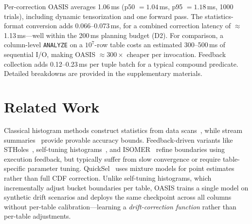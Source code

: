 \documentclass[runningheads]{llncs}
\begin{document}
Per-correction OASIS averages 1.06\,ms (p50 ${=}1.04$\,ms, p95 ${=}1.18$\,ms, 1000 trials), including dynamic tensorization and one forward pass. The statistics-format conversion adds 0.066--0.073\,ms, for a combined correction latency of $\approx$1.13\,ms---well within the 200\,ms planning budget (D2). For comparison, a column-level \texttt{ANALYZE} on a $10^7$-row table costs an estimated 300--500\,ms of sequential I/O, making OASIS ${\approx}300\times$ cheaper per invocation. Feedback collection adds 0.12--0.23\,ms per tuple batch for a typical compound predicate. Detailed breakdowns are provided in the supplementary materials.


\section{Related Work}
\label{sec:related}
Classical histogram methods construct statistics from data scans~\cite{ioannidis1993histogram,poosala1997selectivity}, while stream summaries~\cite{ivkin2019kll,agarwal2013mergeable} provide provable accuracy bounds. Feedback-driven variants like STHoles~\cite{bruno2001stholes}, self-tuning histograms~\cite{aboulnaga1999self}, and ISOMER~\cite{markl2007consistent} refine boundaries using execution feedback, but typically suffer from slow convergence or require table-specific parameter tuning. QuickSel~\cite{park2020quicksel} uses mixture models for point estimates rather than full CDF correction. Unlike self-tuning histograms, which incrementally adjust bucket boundaries per table, OASIS trains a single model on synthetic drift scenarios and deploys the same checkpoint across all columns without per-table calibration---learning a \emph{drift-correction function} rather than per-table adjustments.
\end{document}
